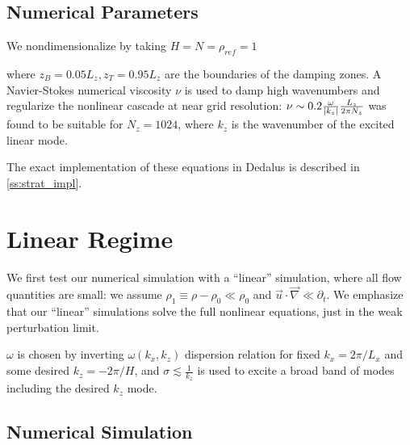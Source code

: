 \documentclass[twocolumn,
        nofootinbib,
        usenames, %
        dvipsnames %
    ]{revtex4-1}%
\DeclarePairedDelimiter\abs{\lvert}{\rvert}
\begin{document}
\subsection{Numerical Parameters}\label{ss:numerics}

We nondimensionalize by taking $H = N = \rho_{ref} = 1$

where $z_B = 0.05L_z, z_T = 0.95L_z$ are the boundaries of the damping zones. A
Navier-Stokes numerical viscosity $\nu$ is used to damp high wavenumbers and
regularize the nonlinear cascade at near grid resolution: $\nu \sim 0.2
\frac{\omega}{\abs*{k_z}}\frac{L_z}{2\pi N_z}$ was found to be suitable for $N_z
= 1024$, where $k_z$ is the wavenumber of the excited linear mode.


The exact implementation of these equations in Dedalus is described in
\autoref{ss:strat_impl}.

\section{Linear Regime}\label{s:lin}

We first test our numerical simulation with a ``linear'' simulation, where
all flow quantities are small: we assume  $\rho_1 \equiv \rho - \rho_0 \ll
\rho_0$ and $\vec{u} \cdot \vec{\nabla} \ll \partial_t$. We emphasize that our
``linear'' simulations solve the full nonlinear equations, just in the weak
perturbation limit.

$\omega$ is chosen by inverting $\omega(k_x, k_z)$ dispersion relation for fixed
$k_x = 2\pi / L_x$ and some desired $k_z = -2\pi/H$, and $\sigma \lesssim
\frac{1}{k_z}$ is used to excite a broad band of modes including the desired
$k_z$ mode.

\subsection{Numerical Simulation}\label{ss:lin_ns}
\end{document}
